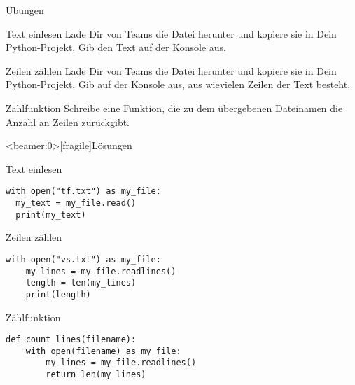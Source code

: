 \begin{frame}{Übungen}
\begin{block}{Text einlesen}
\vspace{2pt}
Lade Dir von Teams die Datei  herunter und kopiere sie in Dein Python-Projekt. Gib den Text auf der Konsole aus. 
\end{block}

\pause 
\vspace{12pt}

\begin{block}{Zeilen zählen}
\vspace{2pt}
Lade Dir von Teams die Datei  herunter und kopiere sie in Dein Python-Projekt. Gib auf der Konsole aus, aus wievielen Zeilen der Text besteht.  
\end{block}

\pause 
\vspace{12pt}

\begin{block}{Zählfunktion}
\vspace{2pt}
Schreibe eine Funktion, die zu dem übergebenen Dateinamen die Anzahl an Zeilen zurückgibt. 
\end{block}
\end{frame}


\begin{frame}<beamer:0>[fragile]{Lösungen}
\begin{solutionblock}{Text einlesen}
\begin{verbatim}
with open("tf.txt") as my_file:
  my_text = my_file.read()
  print(my_text)
\end{verbatim}
\end{solutionblock}
\begin{solutionblock}{Zeilen zählen}
\begin{verbatim}
with open("vs.txt") as my_file:
    my_lines = my_file.readlines()
    length = len(my_lines)
    print(length)
\end{verbatim}
\end{solutionblock}
\begin{solutionblock}{Zählfunktion}
\begin{verbatim}
def count_lines(filename): 
    with open(filename) as my_file:
        my_lines = my_file.readlines()
        return len(my_lines)
\end{verbatim}
\end{solutionblock}
\end{frame}




